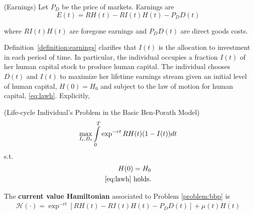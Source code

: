 \begin{definition} (Earnings) \label{definition:earnings}
Let $P_{D}$ be the price of markets. Earnings are
\begin{equation}
E(t) = R H(t) -  R I(t) H(t) - P_{D} D(t) \label{eq:earnings}
\end{equation}

\noindent where $R I(t) H(t)$ are foregone earnings and $ P_{D} D(t) $ are direct goods costs. 
\end{definition}

\indent Definition~\ref{definition:earnings} clarifies that $I(t)$ is the allocation to investment in each period of time. In particular, the individual occupies a fraction $I(t)$ of her human capital stock to produce human capital. The individual chooses $D(t)$ and $I(t)$ to maximize her lifetime earnings stream given an initial level of human capital, $H(0) = H_{0}$ and subject to the law of motion for human capital, \eqref{eq:lawh}. Explicitly,

\begin{problem} \label{problem:bbp} (Life-cycle Individual's Problem in the Basic Ben-Porath Model)
\begin{equation}
\max_{I_{t}, D_{t}} \int \limits _{0} ^{T} \exp^{-rt} RH(t)(1 - I(t)) dt \nonumber \\
\end{equation}
\noindent s.t.
\begin{eqnarray}
H(0) = H_{0} \nonumber \\
\text{\eqref{eq:lawh} holds} \nonumber .
\end{eqnarray}
\end{problem}

\indent The \textbf{current value Hamiltonian} associated to Problem \ref{problem:bbp} is
\begin{equation}
\mathcal{H} (\cdot) = \exp^{-rt} \left[ R H(t) -  R I(t) H(t) - P_{D} D(t) \right] + \mu(t) \dot{H(t)} 
\end{equation}

